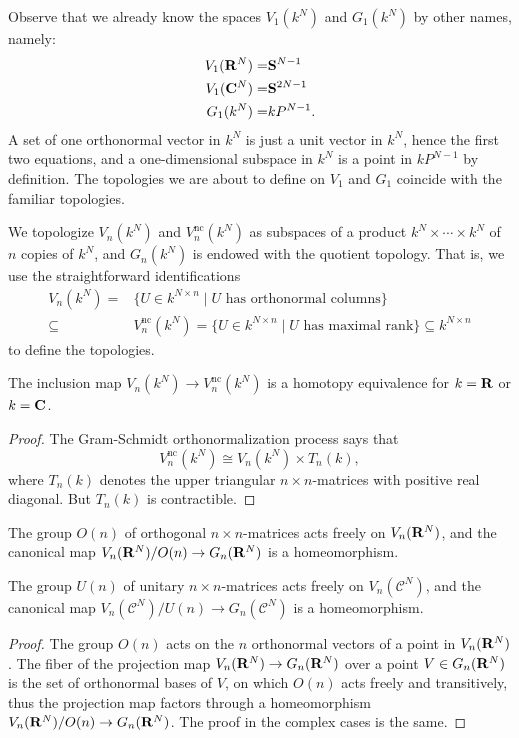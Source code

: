 \documentclass[a4paper,openany]{scrbook}
\renewcommand{\C}{\mathcal C}
\begin{document}
Observe that we already know the spaces $V_1(k^N)$ and $G_1(k^N)$ by other names, namely:
\begin{eqnarray*}
V_1(\mathbf R^{N}) =& \mathbf S^{N-1}\\
V_1(\mathbf C^N) =& \mathbf S^{2N-1}\\
G_1(k^N) =& k P^{N-1}.
\end{eqnarray*}
A set of one orthonormal vector in $k^N$ is just a unit vector in $k^N$, hence the first two equations, and a one-dimensional subspace in $k^N$ is a point in $k P^{N-1}$ by definition. The topologies we are about to define on $V_1$ and $G_1$ coincide with the familiar topologies.

We topologize $V_n(k^N)$ and $V_n^{\operatorname{nc}}(k^N)$ as subspaces of a product $k^N \times \cdots \times k^N$ of $n$ copies of $k^N$, and $G_n(k^N)$ is endowed with the quotient topology. That is, we use the straightforward identifications
\begin{align*}
V_n(k^N) = & \{ U \in k^{N \times n} \mid U \text{ has orthonormal columns}\} \\
\subseteq & V_n^{\operatorname{nc}}(k^N) = \{ U \in k^{N \times n} \mid U \text{ has maximal rank}\} \subseteq k^{N \times n}
\end{align*}
to define the topologies.

\begin{lemma}
The inclusion map $V_n(k^N) \to V_n^{\operatorname{nc}}(k^N)$ is a homotopy equivalence for $k=\mathbf R$ or $k=\mathbf C$.
\end{lemma}
\begin{proof}
The Gram-Schmidt orthonormalization process says that
\[
V_n^{\operatorname{nc}}(k^N) \cong V_n(k^N) \times T_n(k),
\]
where $T_n(k)$ denotes the upper triangular $n\times n$-matrices with positive real diagonal. But $T_n(k)$ is contractible.
\end{proof}

\begin{lemma} \label{lemma:principalfibrationongrassmannian}
The group $O(n)$ of orthogonal $n\times n$-matrices acts freely on $V_n(\mathbf R^N)$, and the canonical map $V_n(\mathbf R^N)/O(n) \to G_n(\mathbf R^N)$ is a homeomorphism. 

The group $U(n)$ of unitary $n\times n$-matrices acts freely on $V_n(\C^N)$, and the canonical map $V_n(\C^N)/U(n) \to G_n(\C^N)$ is a homeomorphism.
\end{lemma}
\begin{proof}
The group $O(n)$ acts on the $n$ orthonormal vectors of a point in $V_n(\mathbf R^N)$. The fiber of the projection map $V_n(\mathbf R^N) \to G_n(\mathbf R^N)$ over a point $V \in G_n(\mathbf R^N)$ is the set of orthonormal bases of $V$, on which $O(n)$ acts freely and transitively, thus the projection map factors through a homeomorphism $V_n(\mathbf R^N)/O(n) \to G_n(\mathbf R^N)$. The proof in the complex cases is the same.
\end{proof}
\end{document}
